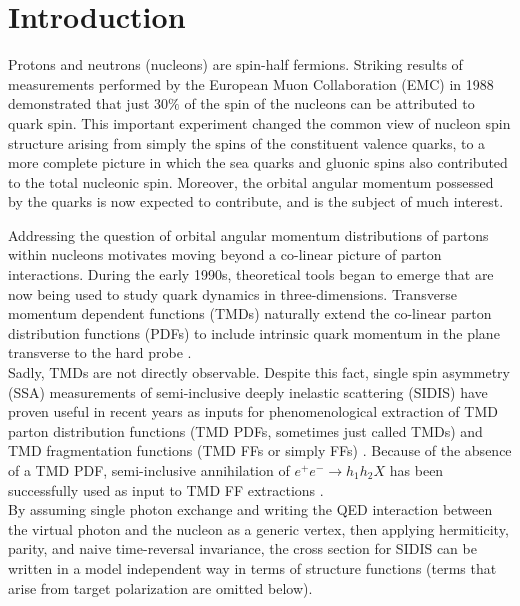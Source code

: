 \chapter{Introduction}

Protons and neutrons (nucleons) are spin-half fermions.  Striking results of measurements performed by the European Muon Collaboration (EMC) in 1988 \cite{pdfs-leader:1988} demonstrated that just $30\%$ of the spin of the nucleons can be attributed to quark spin.  This important experiment changed the common view of nucleon spin structure arising from simply the spins of the constituent valence quarks, to a more complete picture in which the sea quarks and gluonic spins also contributed to the total nucleonic spin.  Moreover, the orbital angular momentum possessed by the quarks is now expected to contribute, and is the subject of much interest.

Addressing the question of orbital angular momentum distributions of partons within nucleons motivates moving beyond a co-linear picture of parton interactions.   During the early 1990s, theoretical tools began to emerge that are now being used to study quark dynamics in three-dimensions.  Transverse momentum dependent functions (TMDs) naturally extend the co-linear parton distribution functions (PDFs) to include intrinsic quark momentum in the plane transverse to the hard probe \cite{tmds-mulders:1995, tmds-bacchetta:2006}.  \\

Sadly, TMDs are not directly observable.  Despite this fact, single spin asymmetry (SSA) measurements of semi-inclusive deeply inelastic scattering (SIDIS) have proven useful in recent years as inputs for phenomenological extraction of TMD parton distribution functions (TMD PDFs, sometimes just called TMDs) and TMD fragmentation functions (TMD FFs or simply FFs) \cite{tmds-airapetian:2009, tmds-airapetian:2012, tmds-aghasyan:2017}.  Because of the absence of a TMD PDF, semi-inclusive annihilation of $e^+ e^- \rightarrow h_1 h_2 X$ has been successfully used as input to TMD FF extractions \cite{tmds-anselmino:2015}.  \\

By assuming single photon exchange and writing the QED interaction between the virtual photon and the nucleon as a generic vertex, then applying hermiticity, parity, and naive time-reversal invariance, the cross section for SIDIS can be written in a model independent way in terms of structure functions \cite{tmds-mulders:1995, tmds-bacchetta:2006} (terms that arise from target polarization are omitted below).  

